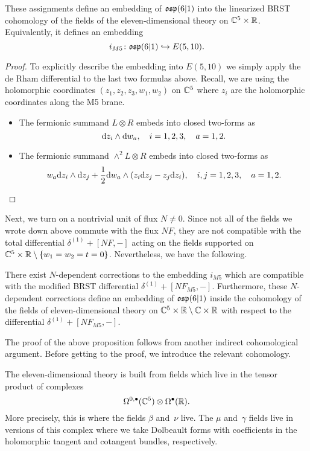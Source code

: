 \begin{lem}
These assignments define an embedding of $\mathfrak{osp}(6|1)$ into the linearized BRST cohomology of the fields of the eleven-dimensional theory on $\mathbb C^5 \times \mathbb R$. 
Equivalently, it defines an embedding
\[
i_{M5} \colon \mathfrak{osp}(6|1) \hookrightarrow E(5,10) .
\]
\end{lem} 

\begin{proof}
To explicitly describe the embedding into $E(5,10)$ we simply apply the de Rham differential to the last two formulas above.
Recall, we are using the holomorphic coordinates $(z_1,z_2,z_3, w_1,w_2)$ on $\mathbb C^5$ where $z_i$ are the holomorphic coordinates along the M5 brane. 
\begin{itemize}
\item 
The fermionic summand $L \otimes R$ embeds into closed two-forms as
\[
{\rm d} z_i \wedge {\rm d} w_a, \quad i=1,2,3, \quad a=1,2. 
\] 
\item 
The fermionic summand $\wedge^2 L \otimes R$ embeds into closed two-forms as
\[
w_a {\rm d} z_i  \wedge {\rm d} z_j + \frac12 {\rm d} w_a \wedge (z_i {\rm d} z_j - z_j {\rm d} z_i) , \quad i,j=1,2,3, \quad a=1,2. 
\] 
\end{itemize}
\end{proof}
\parsec[]

Next, we turn on a nontrivial unit of flux $N \ne 0$. 
Since not all of the fields we wrote down above commute with the flux $N F$, they are not compatible with the total differential $\delta^{(1)} + [N F, -]$ acting on the fields supported on $\mathbb C^5 \times \mathbb R \setminus \{w_1=w_2=t=0\}$. 
Nevertheless, we have the following.

\begin{prop}
\label{prop:brads7}
There exist $N$-dependent corrections to the embedding $i_{M5}$ which are compatible with the modified BRST differential $\delta^{(1)} + [N F_{M5},-]$. 
Furthermore, these $N$-dependent corrections define an embedding of $\mathfrak{osp}(6|1)$ inside the cohomology of the fields of eleven-dimensional theory on $\mathbb C^5 \times \mathbb R \setminus \mathbb C \times \mathbb R$ with respect to the differential $\delta^{(1)} + [N  F_{M5},-]$.
\end{prop}

\parsec[s:thfcohomology]

The proof of the above proposition follows from another indirect cohomological argument. 
Before getting to the proof, we introduce the relevant cohomology. 

The eleven-dimensional theory is built from fields which live in the tensor product of complexes 
\[
\Omega^{0,\bullet}(\mathbb C^5) \otimes \Omega^\bullet(\mathbb R).
\]
More precisely, this is where the  fields $\beta$ and~$\nu$ live. 
The $\mu$ and~$\gamma$ fields live in versions of this complex where we take Dolbeault forms with coefficients in the holomorphic tangent and cotangent bundles, respectively. 

